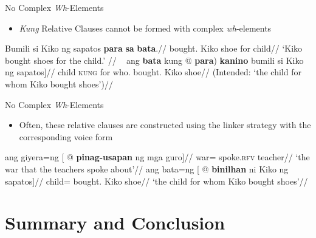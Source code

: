 \documentclass[pdf]{beamer}
\newcommand{\g}[1]{\textsc{#1}}
\newcommand{\texthl}[1]{\textcolor{cyan!75!blue}{\textbf{#1}}}
\begin{document}
\begin{frame}{No Complex \textit{Wh}-Elements}
  \begin{itemize}
    \item \textit{Kung} Relative Clauses cannot be formed with complex \textit{wh}-elements
  \end{itemize}

  \ex\begingl
    \gla  Bumili si Kiko ng sapatos \texthl{para} \texthl{sa} \texthl{bata}.//
    \glb  bought.\Av{} \Nom{} Kiko \Gen{} shoe for \Obl{} child//
    \glft `Kiko bought shoes for the child.'
          //
  \endgl
  \xe
  \ex~\ljudge{*}\begingl
    \gla  ang \texthl{bata} kung \nogloss{[(} @ \textbf{para}) \textbf{kanino} bumili si Kiko ng sapatos]//
    \glb  \Nom{} child \g{kung} for who.\Obl{} bought.\Av{} \Nom{} Kiko \Gen{} shoe//
    \glft (Intended: `the child for whom Kiko bought shoes')//
  \endgl
  \xe
\end{frame}

\begin{frame}{No Complex \textit{Wh}-Elements}
  \begin{itemize}
    \item Often, these relative clauses are constructed using the linker strategy with the corresponding voice form
  \end{itemize}
  \ex\begingl
    \gla  ang giyera=ng [ @ \textbf{pinag-usapan} ng mga guro]//
    \glb  \Nom{} war=\Lk{} spoke.\g{rfv} \Gen{} \Pl{} teacher//
    \glft `the war that the teachers spoke about'//
  \endgl
  \xe
  \ex\begingl
    \gla  ang bata=ng [ @ \textbf{binilhan} ni Kiko ng sapatos]//
    \glb  \Nom{} child=\Lk{} bought.\Lv{} \Gen{} Kiko \Gen{} shoe//
    \glft `the child for whom Kiko bought shoes'//
  \endgl
  \xe
\end{frame}

\section{Summary and Conclusion}
\end{document}
